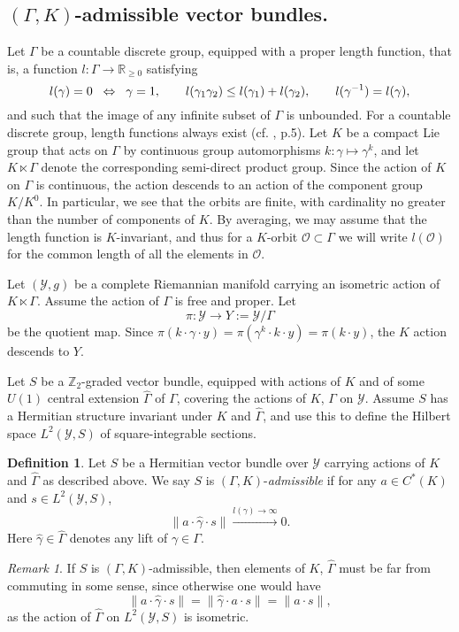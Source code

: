 \documentclass[11pt,reqno]{amsart}
\theoremstyle{definition}
\newtheorem{definition}[theorem]{Definition}
\theoremstyle{remark}
\newtheorem{remark}[theorem]{Remark}
\newcommand{\wh}[1]{\widehat{#1}}
\def\O{\ensuremath{\mathcal{O}}}
\def\Y{\ensuremath{\mathcal{Y}}}
\def\O{\ensuremath{\mathcal{O}}}
\def\bR{\ensuremath{\mathbb{R}}}
\def\bZ{\ensuremath{\mathbb{Z}}}
\def\hGamma{\ensuremath{\widehat{\Gamma}}}
\def\hgamma{\ensuremath{\widehat{\gamma}}}
\begin{document}
\subsection{$(\Gamma,K)$-admissible vector bundles.}\label{sec:GammaK}
Let $\Gamma$ be a countable discrete group, equipped with a proper length function, that is, a function $l \colon \Gamma \rightarrow \bR_{\ge 0}$ satisfying
\[ l(\gamma)=0 \hspace{0.2cm} \Leftrightarrow \hspace{0.2cm} \gamma=1, \qquad l(\gamma_1\gamma_2)\le l(\gamma_1)+l(\gamma_2), \qquad l(\gamma^{-1})=l(\gamma),\]
and such that the image of any infinite subset of $\Gamma$ is unbounded.  For a countable discrete group, length functions always exist (cf. \cite{DoranPark}, p.5).  Let $K$ be a compact Lie group that acts on $\Gamma$ by continuous group automorphisms $k \colon \gamma \mapsto \gamma^k$, and let $K \ltimes \Gamma$ denote the corresponding semi-direct product group.  Since the action of $K$ on $\Gamma$ is continuous, the action descends to an action of the component group $K/K^0$.  In particular, we see that the orbits are finite, with cardinality no greater than the number of components of $K$.  By averaging, we may assume that the length function is $K$-invariant, and thus for a $K$-orbit $\O \subset \Gamma$ we will write $l(\O)$ for the common length of all the elements in $\O$.

Let $(\Y,g)$ be a complete Riemannian manifold carrying an isometric action of $K \ltimes \Gamma$.  Assume the action of $\Gamma$ is free and proper.  Let 
\[ \pi \colon \Y \rightarrow Y:=\Y/\Gamma\] 
be the quotient map.  Since $\pi(k \cdot \gamma \cdot y)=\pi(\gamma^k \cdot k \cdot y)=\pi(k\cdot y)$, the $K$ action descends to $Y$. 

Let $S$ be a $\bZ_2$-graded vector bundle, equipped with actions of $K$ and of some $U(1)$ central extension $\wh{\Gamma}$ of $\Gamma$, covering the actions of $K$, $\Gamma$ on $\Y$.  Assume $S$ has a Hermitian structure invariant under $K$ and $\wh{\Gamma}$, and use this to define the Hilbert space $L^2(\Y,S)$ of square-integrable sections.
\begin{definition}
\label{def:GammaKAdmissible}
Let $S$ be a Hermitian vector bundle over $\Y$ carrying actions of $K$ and $\hGamma$ as described above.  We say $S$ is $(\Gamma,K)$-\emph{admissible} if for any $a \in C^\ast(K)$ and $s \in L^2(\Y,S)$,
\begin{equation}
\label{eqn:AdmissibleCond} 
\|a \cdot \hgamma \cdot s \| \xrightarrow{l(\gamma) \rightarrow \infty} 0.
\end{equation}
Here $\hgamma \in \hGamma$ denotes any lift of $\gamma \in \Gamma$.
\end{definition}
\begin{remark}
If $S$ is $(\Gamma,K)$-admissible, then elements of $K$, $\wh{\Gamma}$ must be far from commuting in some sense, since otherwise one would have 
\[ \|a\cdot \hgamma \cdot s\|=\|\hgamma \cdot a \cdot s\|=\|a\cdot s\|, \]
as the action of $\wh{\Gamma}$ on $L^2(\Y,S)$ is isometric.
\end{remark}
\end{document}

